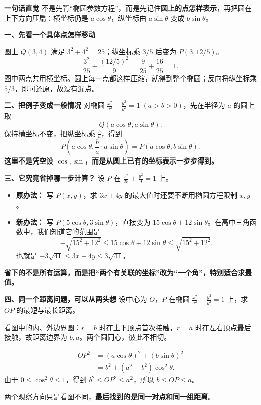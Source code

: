 \begin{explanationbox}
\textbf{\textcolor{CExplanation}{一句话直觉}}
不是先背“椭圆参数方程”，而是先记住\textbf{圆上的点怎样表示}，再把圆在上下方向压扁：横坐标仍是 $a\cos\theta$，纵坐标由 $a\sin\theta$ 变成 $b\sin\theta$。

\medskip
\textbf{\textcolor{CExplanation}{一、先看一个具体点怎样移动}}



圆上 $Q(3,4)$ 满足 $3^2+4^2=25$；纵坐标乘 $3/5$ 后变为 $P(3,12/5)$。
\[
\frac{3^2}{25}+\frac{(12/5)^2}{9}=\frac9{25}+\frac{16}{25}=1.
\]
图中两点共用横坐标。圆上每一点都这样压缩，就得到整个椭圆；反向将纵坐标乘 $5/3$，即可还原，故没有漏点。

\medskip
\textbf{\textcolor{CExplanation}{二、把例子变成一般情况}}
对椭圆 $\frac{x^2}{a^2}+\frac{y^2}{b^2}=1\;(a>b>0)$，先在半径为 $a$ 的圆上取
\[
Q(a\cos\theta,a\sin\theta).
\]
保持横坐标不变，把纵坐标乘 $\frac ba$，得到
\[
P\left(a\cos\theta,\frac ba\cdot a\sin\theta\right)
=P(a\cos\theta,b\sin\theta).
\]
\textbf{这里不是凭空设 $\cos,\sin$，而是从圆上已有的坐标表示一步步得到。}

\medskip
\textbf{\textcolor{CExplanation}{三、它究竟省掉哪一步计算？}}
设 $P$ 在 $\frac{x^2}{25}+\frac{y^2}{9}=1$ 上。
\begin{itemize}[leftmargin=*,itemsep=0.55em,topsep=0.4em]
\item \textbf{原办法：} 写 $P(x,y)$，求 $3x+4y$ 的最大值时还要不断用椭圆方程限制 $x,y$。
\item \textbf{新办法：} 写 $P(5\cos\theta,3\sin\theta)$，直接变为 $15\cos\theta+12\sin\theta$。在高中三角函数中，我们知道它的范围是
\[
-\sqrt{15^2+12^2}\le 15\cos\theta+12\sin\theta\le\sqrt{15^2+12^2}.
\]
也就是 $-3\sqrt{41}\le3x+4y\le3\sqrt{41}$。
\end{itemize}
\textbf{省下的不是所有运算，而是把“两个有关联的坐标”改为“一个角”，特别适合求最值。}

\medskip
\textbf{\textcolor{CExplanation}{四、同一个距离问题，可以从两头想}}
设中心为 $O$，$P$ 在椭圆 $\frac{x^2}{a^2}+\frac{y^2}{b^2}=1$ 上，求 $OP$ 的最短与最长距离。


\begin{description}[style=nextline,leftmargin=2.8em,labelsep=0.5em,itemsep=0.55em]
\item[\textbf{看法 A：固定 $O$，圆向外变大。}]
看图中的内、外边界圆：$r=b$ 时在上下顶点首次接触，$r=a$ 时在左右顶点最后接触，故距离边界为 $b,a$。两个圆同心，彼此不相切。
\item[\textbf{看法 B：让 $P$ 走动，直接量 $OP$。}]
\[
\begin{aligned}
OP^2&=(a\cos\theta)^2+(b\sin\theta)^2\\
&=b^2+(a^2-b^2)\cos^2\theta.
\end{aligned}
\]
由于 $0\le\cos^2\theta\le1$，得到 $b^2\le OP^2\le a^2$，所以 $b\le OP\le a$。
\end{description}
两个观察方向只是看图不同，\textbf{最后找到的是同一对点和同一组距离}。


\end{explanationbox}
